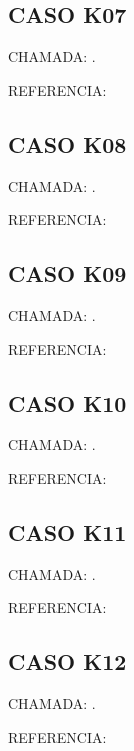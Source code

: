 \documentclass{undftex}
\begin{document}
\begin{refsection}\section*{CASO K07} CHAMADA: . \textcite{k07}\par REFERENCIA:\par\printbibliography[heading=none,check=undfconsultadas]\end{refsection}\clearpage
\begin{refsection}\section*{CASO K08} CHAMADA: . \textcite{k08}\par REFERENCIA:\par\printbibliography[heading=none,check=undfconsultadas]\end{refsection}\clearpage
\begin{refsection}\section*{CASO K09} CHAMADA: . \textcite{k09}\par REFERENCIA:\par\printbibliography[heading=none,check=undfconsultadas]\end{refsection}\clearpage
\begin{refsection}\section*{CASO K10} CHAMADA: . \textcite{k10}\par REFERENCIA:\par\printbibliography[heading=none,check=undfconsultadas]\end{refsection}\clearpage
\begin{refsection}\section*{CASO K11} CHAMADA: . \textcite{k11}\par REFERENCIA:\par\printbibliography[heading=none,check=undfconsultadas]\end{refsection}\clearpage
\begin{refsection}\section*{CASO K12} CHAMADA: . \textcite{k12}\par REFERENCIA:\par\printbibliography[heading=none,check=undfconsultadas]\end{refsection}\clearpage
\end{document}
